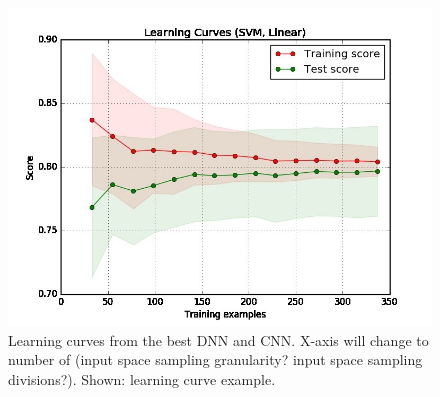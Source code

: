 \begin{figure}[H]
	\centering
	\includegraphics[width=0.8\linewidth]{model_choice_hyperparameter_search_images/learning_curve_dummy}
	\caption{Learning curves from the best DNN and CNN. X-axis will change to number of (input space sampling granularity? input space sampling divisions?). Shown: learning curve example.}
	\label{fig:Node}
\end{figure}









